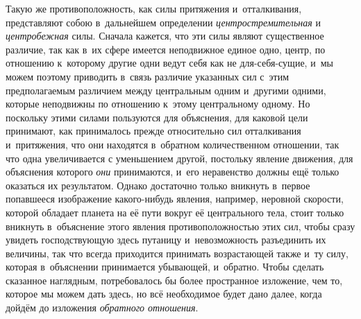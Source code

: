 Такую же противоположность, как силы притяжения и~отталкивания, представляют
собою в~дальнейшем определении {\em центростремительная} и
{\em центробежная} силы. Сначала кажется, что эти силы
являют существенное различие, так как в~их сфере имеется неподвижное единое
одно, центр, по отношению к~которому другие одни ведут себя как не
для-себя-сущие, и~мы можем поэтому приводить в~связь различие указанных сил
с~этим предполагаемым различием между центральным одним и~другими одними,
которые неподвижны по отношению к~этому центральному одному. Но поскольку
этими силами пользуются для объяснения, для каковой цели принимают, как
принималось прежде относительно сил отталкивания и~притяжения, что они
находятся в~обратном количественном отношении, так что одна увеличивается с
уменьшением другой, постольку явление движения, для объяснения которого
{\em они} принимаются, и~его неравенство должны ещё
только оказаться их результатом. Однако достаточно только вникнуть в~первое
попавшееся изображение какого-нибудь явления, например, неровной скорости,
которой обладает планета на её пути вокруг её центрального тела, стоит
только вникнуть в~объяснение этого явления противоположностью этих сил,
чтобы сразу увидеть господствующую здесь путаницу и~невозможность
разъединить их величины, так что всегда приходится принимать возрастающей
также и~ту силу, которая в~объяснении принимается убывающей, и~обратно.
Чтобы сделать сказанное наглядным, потребовалось бы более пространное
изложение, чем то, которое мы можем дать здесь, но всё необходимое будет
дано далее, когда дойдём до изложения {\em обратного отношения}.

\bigskip
